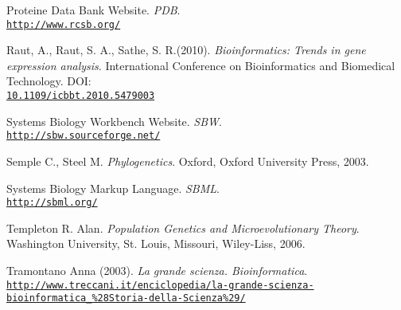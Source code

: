 \documentclass[twoside,openright,titlepage,fleqn,
,	headinclude,12pt,a4paper,BCOR5mm,footinclude,table]{scrbook}
\newcommand{\?}{'\-\nobreak\hspace{0pt}}
\begin{document}
\begin{thebibliography}{50}
Proteine Data Bank Website.\newline
\textit{PDB}.
\\\texttt{\url{http://www.rcsb.org/}}

Raut, A., Raut, S. A., Sathe, S. R.(2010). \newline
\textit{Bioinformatics: Trends in gene expression analysis}.\newline
International Conference on Bioinformatics and Biomedical Technology.\newline
DOI:\\\texttt{\url{10.1109/icbbt.2010.5479003}}

Systems Biology Workbench Website.\newline
\textit{SBW}.
\\\texttt{\url{http://sbw.sourceforge.net/}}

Semple C., Steel M.\newline
\textit{Phylogenetics}.\newline
Oxford, Oxford University Press, 2003.

Systems Biology Markup Language.\newline
\textit{SBML}.
\\\texttt{\url{http://sbml.org/}}

Templeton R. Alan.\newline
\textit{Population Genetics and Microevolutionary Theory}.\newline
Washington University, St. Louis, Missouri, Wiley-Liss, 2006.

Tramontano Anna (2003).\newline
\textit{La grande scienza. Bioinformatica}.
\\\texttt{\url{http://www.treccani.it/enciclopedia/la-grande-scienza-bioinformatica_\%28Storia-della-Scienza\%29/}}

\end{thebibliography}


\end{document}
